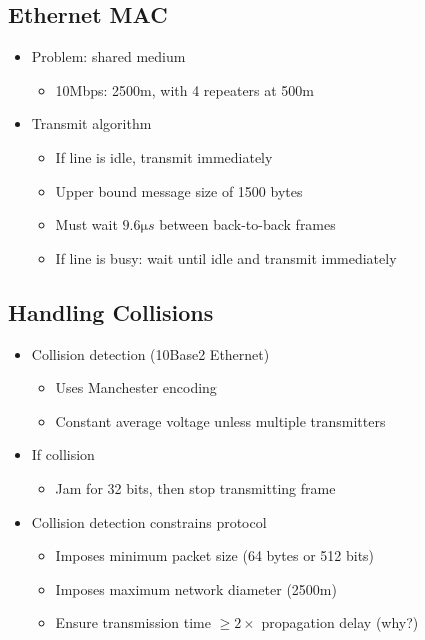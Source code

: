 \subsection{Ethernet MAC}
\begin{itemize}[nosep]
    \item Problem: shared medium
          \begin{itemize}[nosep]
              \item 10Mbps: 2500m, with 4 repeaters at 500m
          \end{itemize}
    \item Transmit algorithm
          \begin{itemize}[nosep]
              \item If line is idle, transmit immediately
              \item Upper bound message size of 1500 bytes
              \item Must wait $9.6\si{\micro s}$ between back-to-back frames
              \item If line is busy: wait until idle and transmit immediately
          \end{itemize}
\end{itemize}

\subsection{Handling Collisions}
\begin{itemize}[nosep]
    \item Collision detection (10Base2 Ethernet)
          \begin{itemize}[nosep]
              \item Uses Manchester encoding
              \item Constant average voltage unless multiple transmitters
          \end{itemize}
    \item If collision
          \begin{itemize}[nosep]
              \item Jam for 32 bits, then stop transmitting frame
          \end{itemize}
    \item Collision detection constrains protocol
          \begin{itemize}[nosep]
              \item Imposes minimum packet size (64 bytes or 512 bits)
              \item Imposes maximum network diameter (2500m)
              \item Ensure transmission time $\geq 2\times$ propagation delay (why?)
          \end{itemize}
\end{itemize}

